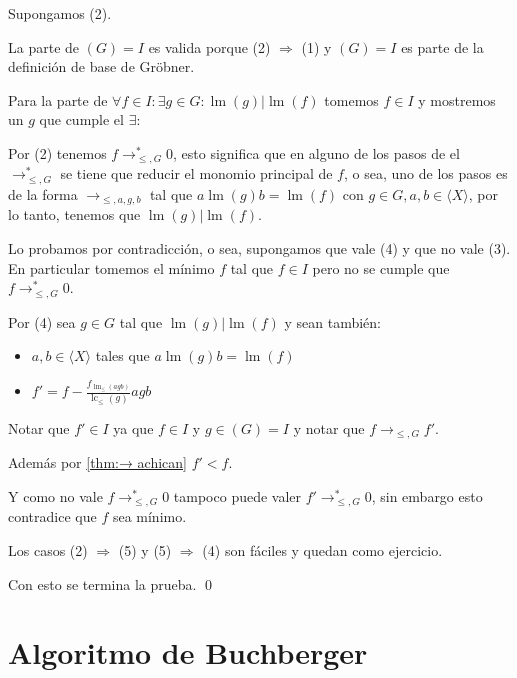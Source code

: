 \documentclass{report}
\theoremstyle{customstyle}
\renewenvironment{proof}[1][\proofname]{{\bfseries #1: }}{\qed} %
\theoremstyle{factstyle}
\DeclareMathOperator{\lm}{lm}
\DeclareMathOperator{\lc}{lc}
\begin{document}
\begin{proof}
\begin{description}
    \item[(2) $⇒$ (4)] Supongamos (2).

    La parte de $(G) = I$ es valida porque (2) $⇒$ (1) y $(G) = I$ es parte de la definición de base de Gröbner.

    Para la parte de $∀f ∈ I : ∃g ∈ G : \lm(g) | \lm(f)$ tomemos $f ∈ I$ y mostremos un $g$ que cumple el $∃$:

    Por (2) tenemos $f →^*_{≤, G} 0$, esto significa que en alguno de los pasos de el $→^*_{≤, G}$ se tiene que reducir el monomio principal de $f$, o sea, uno de los pasos es de la forma $→_{≤, a, g, b}$ tal que $a \lm(g) b = \lm(f)$ con $g ∈ G, a, b ∈ ⟨X⟩$, por lo tanto, tenemos que $\lm(g) | \lm(f)$.

    \item[(4) $⇒$ (3)] Lo probamos por contradicción, o sea, supongamos que vale (4) y que no vale (3). En particular tomemos el mínimo $f$ tal que $f ∈ I$ pero no se cumple que $f →^*_{≤, G} 0$.

    Por (4) sea $g ∈ G$ tal que $\lm(g) | \lm(f)$ y sean también:
    \begin{itemize}
      \item $a, b ∈ ⟨X⟩$ tales que $a \lm(g) b = \lm(f)$
      \item $f' = f - \frac{f_{\lm_≤(agb)}}{\lc_≤(g)}agb$
    \end{itemize}

    Notar que $f' ∈ I$ ya que $f ∈ I$ y $g ∈ (G) = I$ y notar que $f →_{≤, G} f'$.

    Además por \cref{thm:→ achican} $f' < f$.

    Y como no vale $f →^*_{≤, G} 0$ tampoco puede valer $f' →^*_{≤, G} 0$, sin embargo esto contradice que $f$ sea mínimo.

    \item Los casos (2) $⇒$ (5) y (5) $⇒$ (4) son fáciles y quedan como ejercicio. %

  \end{description}
  Con esto se termina la prueba.
\end{proof}


\section{Algoritmo de Buchberger}
\end{document}
